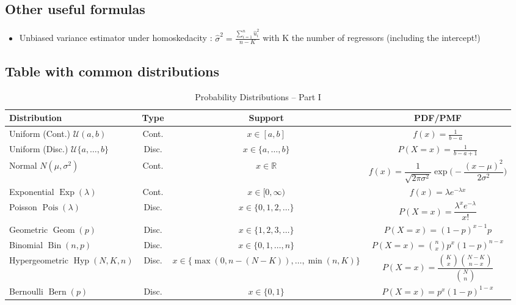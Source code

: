 \documentclass{article}
\begin{document}
\subsection{Other useful formulas}
\begin{itemize}
    \item Unbiased variance estimator under homoskedacity : $\hat{\sigma}^2= \frac{\sum_{i=1}^n \hat{u}_i^2}{n-K}$ with K the number of regressors (including the intercept!)
\end{itemize}


\subsection{Table with common distributions}

\begin{table}[H]
\centering
\caption{Probability Distributions -- Part I}
\label{tab:dist_part1}
\renewcommand{\arraystretch}{1.3}
\begin{tabular}{l c c c}
\toprule
\textbf{Distribution} & \textbf{Type} & \textbf{Support} & \textbf{PDF/PMF} \\
\midrule
\makecell{Uniform \\ (Cont.) \\ $\mathcal{U}(a,b)$} & Cont. & $x\in[a,b]$ & $f(x)=\frac{1}{b-a}$ \\
\makecell{Uniform \\ (Disc.) \\ $\mathcal{U}\{a,\dots,b\}$} & Disc. & $x\in\{a,\dots,b\}$ & $P(X=x)=\frac{1}{b-a+1}$\\
\makecell{Normal \\ $N(\mu,\sigma^2)$} & Cont. & $x\in\mathbb{R}$ & $f(x)=\dfrac{1}{\sqrt{2\pi\sigma^2}}\exp\Big(-\dfrac{(x-\mu)^2}{2\sigma^2}\Big)$ \\
\makecell{Exponential \\ $\operatorname{Exp}(\lambda)$} & Cont. & $x\in[0,\infty)$ & $f(x)=\lambda e^{-\lambda x}$ \\
\makecell{Poisson \\ $\operatorname{Pois}(\lambda)$} & Disc. & $x\in\{0,1,2,\dots\}$ & $P(X=x)=\dfrac{\lambda^x e^{-\lambda}}{x!}$ \\
\makecell{Geometric \\ $\operatorname{Geom}(p)$} & Disc. & $x\in\{1,2,3,\dots\}$ & $P(X=x)=(1-p)^{x-1}p$ \\
\makecell{Binomial \\ $\operatorname{Bin}(n,p)$} & Disc. & $x\in\{0,1,\dots,n\}$ & $P(X=x)=\binom{n}{x}p^x(1-p)^{n-x}$ \\
\makecell{Hypergeometric \\ $\operatorname{Hyp}(N,K,n)$} & Disc. & $x\in\{\max(0,n-(N-K)),\dots,\min(n,K)\}$ & $P(X=x)=\dfrac{\binom{K}{x}\binom{N-K}{n-x}}{\binom{N}{n}}$ \\
\makecell{Bernoulli \\ $\operatorname{Bern}(p)$} & Disc. & $x\in\{0,1\}$ & $P(X=x)=p^x(1-p)^{1-x}$ \\
\bottomrule
\end{tabular}
\end{table}
\end{document}
